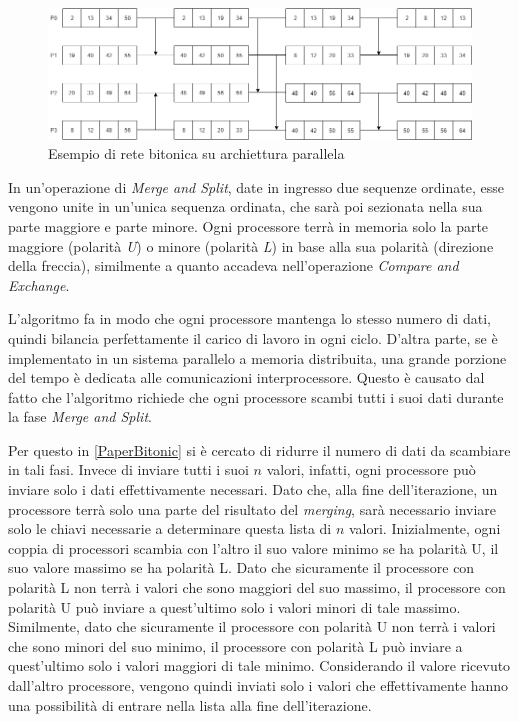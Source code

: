 \begin{figure}[h!]
  \centering
  \includegraphics[width=\linewidth]{Images/bitonic2.png}
  \caption{Esempio di rete bitonica su archiettura parallela}
  \label{bitonic2}
\end{figure}

In un'operazione di \textit{Merge and Split}, date in ingresso due sequenze ordinate, esse vengono unite in un'unica sequenza ordinata, che sarà poi sezionata nella sua parte maggiore e parte minore. Ogni processore terrà in memoria solo la parte maggiore (polarità \textit{U}) o minore (polarità \textit{L}) in base alla sua polarità (direzione della freccia), similmente a quanto accadeva nell'operazione \textit{Compare and Exchange}.

L'algoritmo fa in modo che ogni processore mantenga lo stesso numero di dati, quindi bilancia perfettamente il carico di lavoro in ogni ciclo. D'altra parte, se è implementato in un sistema parallelo a memoria distribuita, una grande porzione del tempo è dedicata alle comunicazioni interprocessore. Questo è causato dal fatto che l'algoritmo richiede che ogni processore scambi tutti i suoi dati durante la fase \textit{Merge and Split}.

Per questo in \ref{PaperBitonic} si è cercato di ridurre il numero di dati da scambiare in tali fasi. Invece di inviare tutti i suoi $n$ valori, infatti, ogni processore può inviare solo i dati effettivamente necessari. Dato che, alla fine dell'iterazione, un processore terrà solo una parte del risultato del \textit{merging}, sarà necessario inviare solo le chiavi necessarie a determinare questa lista di $n$ valori. Inizialmente, ogni coppia di processori scambia con l'altro il suo valore minimo se ha polarità U, il suo valore massimo se ha polarità L. Dato che sicuramente il processore con polarità L non terrà i valori che sono maggiori del suo massimo, il processore con polarità U può inviare a quest'ultimo solo i valori minori di tale massimo. Similmente, dato che sicuramente il processore con polarità U non terrà i valori che sono minori del suo minimo, il processore con polarità L può inviare a quest'ultimo solo i valori maggiori di tale minimo. Considerando il valore ricevuto dall'altro processore, vengono quindi inviati solo i valori che effettivamente hanno una possibilità di entrare nella lista alla fine dell'iterazione.

